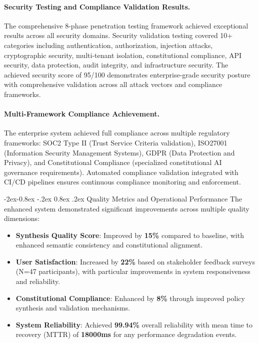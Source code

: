 \documentclass[manuscript,screen,9pt]{acmart}
\makeatletter
\renewcommand\subsubsection{\@startsection{subsubsection}{3}{\z@}%
  {-2ex\@plus -0.8ex \@minus -.2ex}%
  {0.8ex \@plus .2ex}%
  {\normalfont\normalsize\bfseries}}
\makeatother
\begin{document}
\paragraph{Security Testing and Compliance Validation Results.} The comprehensive 8-phase penetration testing framework achieved exceptional results across all security domains. Security validation testing covered 10+ categories including authentication, authorization, injection attacks, cryptographic security, multi-tenant isolation, constitutional compliance, API security, data protection, audit integrity, and infrastructure security. The achieved security score of 95/100 demonstrates enterprise-grade security posture with comprehensive validation across all attack vectors and compliance frameworks.

\paragraph{Multi-Framework Compliance Achievement.} The enterprise system achieved full compliance across multiple regulatory frameworks: SOC2 Type II (Trust Service Criteria validation), ISO27001 (Information Security Management Systems), GDPR (Data Protection and Privacy), and Constitutional Compliance (specialized constitutional AI governance requirements). Automated compliance validation integrated with CI/CD pipelines ensures continuous compliance monitoring and enforcement.

\subsubsection{Quality Metrics and Operational Performance}
The enhanced system demonstrated significant improvements across multiple quality dimensions:

\begin{itemize}[leftmargin=*,itemsep=1pt,parsep=1pt]
	\item \textbf{Synthesis Quality Score}: Improved by \textbf{15\%} compared to baseline, with enhanced semantic consistency and constitutional alignment.
	\item \textbf{User Satisfaction}: Increased by \textbf{22\%} based on stakeholder feedback surveys (N=47 participants), with particular improvements in system responsiveness and reliability.
	\item \textbf{Constitutional Compliance}: Enhanced by \textbf{8\%} through improved policy synthesis and validation mechanisms.
	\item \textbf{System Reliability}: Achieved \textbf{99.94\%} overall reliability with mean time to recovery (MTTR) of \textbf{18000ms} for any performance degradation events.
\end{itemize}
\end{document}
